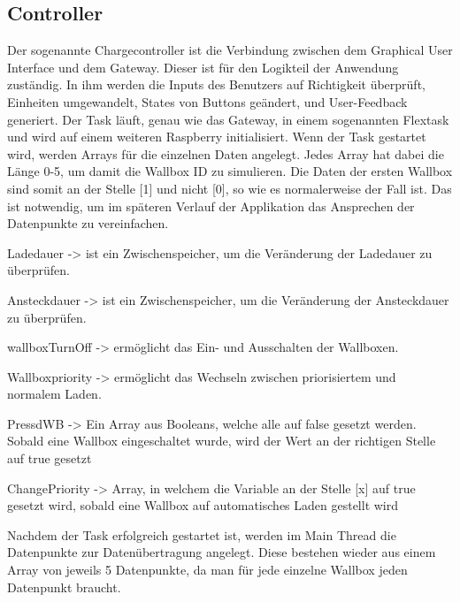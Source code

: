 \subsection{Controller} 


Der sogenannte Chargecontroller ist die Verbindung zwischen dem Graphical User Interface und dem Gateway. Dieser ist für den Logikteil der Anwendung zuständig. In ihm werden die Inputs des Benutzers auf Richtigkeit überprüft, Einheiten umgewandelt, States von Buttons geändert, und User-Feedback generiert. Der Task läuft, genau wie das Gateway, in einem sogenannten Flextask und wird auf einem weiteren Raspberry initialisiert. Wenn der Task gestartet wird, werden Arrays für die einzelnen Daten angelegt. Jedes Array hat dabei die Länge 0-5, um damit die Wallbox ID zu simulieren. Die Daten der ersten Wallbox sind somit an der Stelle [1] und nicht [0], so wie es normalerweise der Fall ist. Das ist notwendig, um im späteren Verlauf der Applikation das Ansprechen der Datenpunkte zu vereinfachen.
\begin{compactitem}
  \item Ladedauer -> ist ein Zwischenspeicher, um die Veränderung der Ladedauer zu überprüfen.
  \item Ansteckdauer -> ist ein Zwischenspeicher, um die Veränderung der Ansteckdauer zu überprüfen.
  \item wallboxTurnOff -> ermöglicht das Ein- und Ausschalten der Wallboxen.
  \item Wallboxpriority -> ermöglicht das Wechseln zwischen priorisiertem und normalem Laden.
  \item PressdWB -> Ein Array aus Booleans, welche alle auf false gesetzt werden. Sobald eine Wallbox eingeschaltet wurde, wird der Wert an der richtigen Stelle auf true gesetzt
  \item ChangePriority -> Array, in welchem die Variable an der Stelle [x] auf true gesetzt wird, sobald eine Wallbox auf automatisches Laden gestellt wird
\end{compactitem}

Nachdem der Task erfolgreich gestartet ist, werden im Main Thread die Datenpunkte zur Datenübertragung angelegt. Diese bestehen wieder aus einem Array von jeweils 5 Datenpunkte, da man für jede einzelne Wallbox jeden Datenpunkt braucht.

